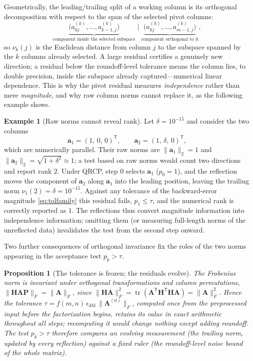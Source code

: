 \documentclass[11pt,a4paper]{article}
\newtheorem{proposition}[theorem]{Proposition}
\theoremstyle{definition}
\newtheorem{example}[theorem]{Example}
\newcommand{\eps}{\epsilon_{\mathrm{dbl}}}
\newcommand{\normF}[1]{\|#1\|_{F}}
\begin{document}
Geometrically, the leading/trailing split of a working column is its
orthogonal decomposition with respect to the span of the selected
pivot columns:
\begin{equation}
  \underbrace{\bigl(a^{(k)}_{0j},\dots,a^{(k)}_{k-1,j}\bigr)}
             _{\text{component inside the selected subspace}}
  \;\Big|\;
  \underbrace{\bigl(a^{(k)}_{kj},\dots,a^{(k)}_{m-1,j}\bigr)}
             _{\text{component orthogonal to it}},
\end{equation}
so $\nu_k(j)$ is the Euclidean distance from column $j$ to the
subspace spanned by the $k$ columns already selected. A large
residual certifies a genuinely new direction; a residual below the
roundoff-level tolerance means the column lies, to double precision,
inside the subspace already captured---numerical linear dependence.
This is why the pivot residual measures \emph{independence} rather
than mere \emph{magnitude}, and why raw column norms cannot replace
it, as the following example shows.

\begin{example}[Raw norms cannot reveal rank]
\label{ex:nearparallel}
Let $\delta=10^{-15}$ and consider the two columns
\begin{equation}
  \bm a_{1}=(1,\,0,\,0)^{\mathsf T},
  \qquad
  \bm a_{2}=(1,\,\delta,\,0)^{\mathsf T},
\end{equation}
which are numerically parallel. Their raw norms are
$\|\bm a_{1}\|_{2}=1$ and $\|\bm a_{2}\|_{2}=\sqrt{1+\delta^{2}}
\approx1$; a test based on raw norms would count two directions and
report rank $2$. Under QRCP, step $0$ selects $\bm a_{1}$
($p_{0}=1$), and the reflection moves the component of $\bm a_{2}$
along $\bm a_{1}$ into the leading position, leaving the trailing
norm $\nu_{1}(2)=\delta=10^{-15}$. Against any tolerance of the
backward-error magnitude \eqref{eq:tolfamily} this residual fails,
$p_{1}\le\tau$, and the numerical rank is correctly reported as $1$.
The reflections thus convert magnitude information into independence
information; omitting them (or measuring full-length norms of the
unreflected data) invalidates the test from the second step onward.
\end{example}

Two further consequences of orthogonal invariance fix the roles of the
two norms appearing in the acceptance test $p_k>\tau$.

\begin{proposition}[The tolerance is frozen; the residuals evolve]
\label{prop:frozen}
The Frobenius norm is invariant under orthogonal transformations and
column permutations,
$\normF{\bm H\bm A\bm P}=\normF{\bm A}$, since
$\normF{\bm H\bm A}^{2}
=\operatorname{tr}(\bm A^{\mathsf T}\bm H^{\mathsf T}\bm H\bm A)
=\normF{\bm A}^{2}$. Hence the tolerance
$\tau=f(m,n)\,\eps\,\normF{\bm A^{(0)}}$, computed once from the
preprocessed input before the factorization begins, retains its value
in exact arithmetic throughout all steps; recomputing it would change
nothing except adding roundoff. The test $p_k>\tau$ therefore
compares an evolving measurement (the trailing norm, updated by every
reflection) against a fixed ruler (the roundoff-level noise bound of
the whole matrix).
\end{proposition}
\end{document}
